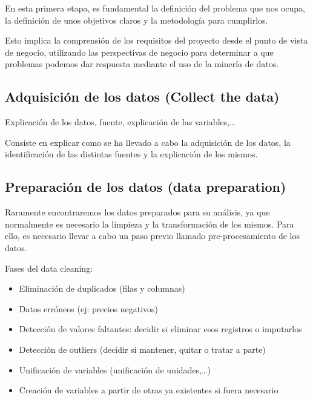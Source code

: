 \documentclass[12pt,a4paper,]{book}
\providecommand{\tightlist}{%
  \setlength{\itemsep}{0pt}\setlength{\parskip}{0pt}}
\numberwithin{dummy}{section}
\theoremstyle{ocrenumbox}
\theoremstyle{blacknumex}
\theoremstyle{blacknumbox}
\theoremstyle{ocrenum}
\theoremstyle{ocrenum}
\begin{document}
En esta primera etapa, es fundamental la definición del problema que nos
ocupa, la definición de unos objetivos claros y la metodología para
cumplirlos.

Esto implica la comprensión de los requisitos del proyecto desde el
punto de vista de negocio, utilizando las perspectivas de negocio para
determinar a que problemas podemos dar respuesta mediante el uso de la
minería de datos.

\hypertarget{adquisiciuxf3n-de-los-datos-collect-the-data}{%
\subsection{Adquisición de los datos (Collect the
data)}\label{adquisiciuxf3n-de-los-datos-collect-the-data}}

Explicación de los datos, fuente, explicación de las variables,\ldots{}

Consiste en explicar como se ha llevado a cabo la adquisición de los
datos, la identificación de las distintas fuentes y la explicación de
los mismos.

\hypertarget{preparaciuxf3n-de-los-datos-data-preparation}{%
\subsection{Preparación de los datos (data
preparation)}\label{preparaciuxf3n-de-los-datos-data-preparation}}

Raramente encontraremos los datos preparados para su análisis, ya que
normalmente es necesario la limpieza y la transformación de los mismos.
Para ello, es necesario llevar a cabo un paso previo llamado
pre-procesamiento de los datos.

Fases del data cleaning:

\begin{itemize}
\tightlist
\item
  Eliminación de duplicados (filas y columnas)
\item
  Datos erróneos (ej: precios negativos)
\item
  Detección de valores faltantes: decidir si eliminar esos registros o
  imputarlos
\item
  Detección de outliers (decidir si mantener, quitar o tratar a parte)
\item
  Unificación de variables (unificación de unidades,\ldots)
\item
  Creación de variables a partir de otras ya existentes si fuera
  necesario
\end{itemize}
\end{document}
